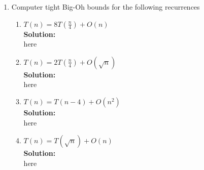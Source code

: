 \documentclass{article}
\begin{document}
    \begin{enumerate}[label=\textbf{Q1}]
        \item Computer tight Big-Oh bounds for the following recurrences
        \begin{enumerate}[label=\alph*.]
            \item $T(n) = 8T(\frac{n}{4}) + O(n)$\\
            \textbf{Solution:}\\
            here
            \item $T(n) = 2T(\frac{n}{4}) + O(\sqrt{n})$\\
            \textbf{Solution:}\\
            here
            \item $T(n) = T(n-4) + O(n^2)$\\
            \textbf{Solution:}\\
            here
            \item $T(n) = T(\sqrt{n}) + O(n)$\\
            \textbf{Solution:}\\
            here
        \end{enumerate}
    \end{enumerate}
\end{document}
